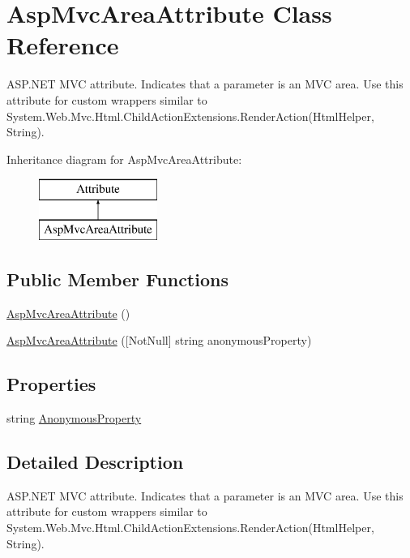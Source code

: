 \hypertarget{class_asp_mvc_area_attribute}{}\section{Asp\+Mvc\+Area\+Attribute Class Reference}
\label{class_asp_mvc_area_attribute}


A\+S\+P.\+N\+ET M\+VC attribute. Indicates that a parameter is an M\+VC area. Use this attribute for custom wrappers similar to {\ttfamily System.\+Web.\+Mvc.\+Html.\+Child\+Action\+Extensions.\+Render\+Action(\+Html\+Helper, String)}.  


Inheritance diagram for Asp\+Mvc\+Area\+Attribute\+:\begin{figure}[H]
\begin{center}
\leavevmode
\includegraphics[height=2.000000cm]{class_asp_mvc_area_attribute}
\end{center}
\end{figure}
\subsection*{Public Member Functions}
\begin{DoxyCompactItemize}
\item 
\mbox{\hyperlink{class_asp_mvc_area_attribute_ad0a2217f02a87a3076399063598635b0}{Asp\+Mvc\+Area\+Attribute}} ()
\item 
\mbox{\hyperlink{class_asp_mvc_area_attribute_a9f0394df51e161601d7a3bb8523dd0d3}{Asp\+Mvc\+Area\+Attribute}} (\mbox{[}Not\+Null\mbox{]} string anonymous\+Property)
\end{DoxyCompactItemize}
\subsection*{Properties}
\begin{DoxyCompactItemize}
\item 
string \mbox{\hyperlink{class_asp_mvc_area_attribute_a035e4e50658d154dfa22d68a08425a6b}{Anonymous\+Property}}
\end{DoxyCompactItemize}


\subsection{Detailed Description}
A\+S\+P.\+N\+ET M\+VC attribute. Indicates that a parameter is an M\+VC area. Use this attribute for custom wrappers similar to {\ttfamily System.\+Web.\+Mvc.\+Html.\+Child\+Action\+Extensions.\+Render\+Action(\+Html\+Helper, String)}. 



